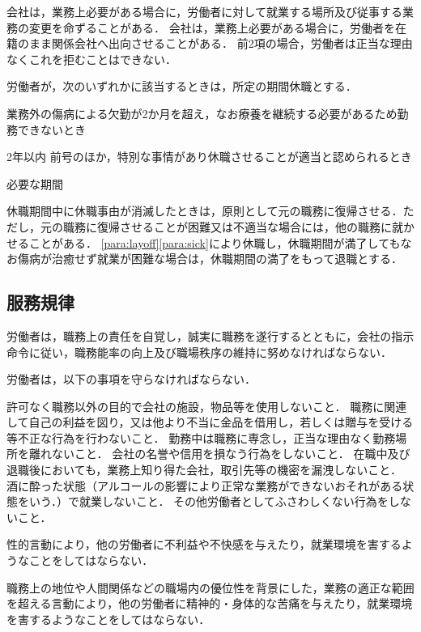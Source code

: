 \documentclass[11pt,a4paper]{jsarticle}
\begin{document}
会社は，業務上必要がある場合に，労働者に対して就業する場所及び従事する業務の変更を命ずることがある．
\term
会社は，業務上必要がある場合に，労働者を在籍のまま関係会社へ出向させることがある．
\term
前2項の場合，労働者は正当な理由なくこれを拒むことはできない．

労働者が，次のいずれかに該当するときは，所定の期間休職とする．
\label{para:layoff}
\begin{enumerate}
	\itm 業務外の傷病による欠勤が2か月を超え，なお療養を継続する必要があるため勤務できないとき\par 2年以内
	\label{para:sick}
	\itm 前号のほか，特別な事情があり休職させることが適当と認められるとき\par 必要な期間
\end{enumerate}
\term
休職期間中に休職事由が消滅したときは，原則として元の職務に復帰させる．ただし，元の職務に復帰させることが困難又は不適当な場合には，他の職務に就かせることがある．
\term
\ref{para:layoff}\ref{para:sick}により休職し，休職期間が満了してもなお傷病が治癒せず就業が困難な場合は，休職期間の満了をもって退職とする．

\subsection{服務規律}

労働者は，職務上の責任を自覚し，誠実に職務を遂行するとともに，会社の指示命令に従い，職務能率の向上及び職場秩序の維持に努めなければならない．

労働者は，以下の事項を守らなければならない．\label{para:obey}
\begin{enumerate}
	\itm	許可なく職務以外の目的で会社の施設，物品等を使用しないこと．
	\itm	職務に関連して自己の利益を図り，又は他より不当に金品を借用し，若しくは贈与を受ける等不正な行為を行わないこと．
	\itm	勤務中は職務に専念し，正当な理由なく勤務場所を離れないこと．
	\itm	会社の名誉や信用を損なう行為をしないこと．
	\itm	在職中及び退職後においても，業務上知り得た会社，取引先等の機密を漏洩しないこと．
	\itm	酒に酔った状態（アルコールの影響により正常な業務ができないおそれがある状態をいう．）で就業しないこと．
	\itm	その他労働者としてふさわしくない行為をしないこと．
\end{enumerate}

性的言動により，他の労働者に不利益や不快感を与えたり，就業環境を害するようなことをしてはならない．
\label{para:sexsualharrassment}

職務上の地位や人間関係などの職場内の優位性を背景にした，業務の適正な範囲を超える言動により，他の労働者に精神的・身体的な苦痛を与えたり，就業環境を害するようなことをしてはならない．
\label{para:powerharrassment}
\end{document}
